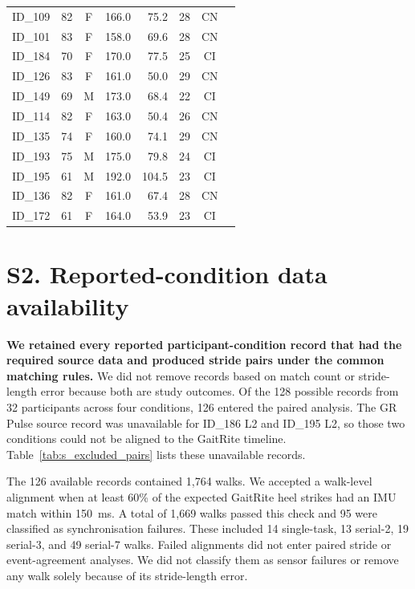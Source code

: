 \documentclass[fleqn,10pt,lineno]{wlpeerj}
\begin{document}
\begin{table}[!ht]
\begin{tabular}{@{}lccrrrcc@{}}
ID\_109 & 82 & F & 166.0 & 75.2 & 28 & CN & \\
ID\_101 & 83 & F & 158.0 & 69.6 & 28 & CN & \\
ID\_184 & 70 & F & 170.0 & 77.5 & 25 & CI & \\
ID\_126 & 83 & F & 161.0 & 50.0 & 29 & CN & \\
ID\_149 & 69 & M & 173.0 & 68.4 & 22 & CI & \\
ID\_114 & 82 & F & 163.0 & 50.4 & 26 & CN & \\
ID\_135 & 74 & F & 160.0 & 74.1 & 29 & CN & \\
ID\_193 & 75 & M & 175.0 & 79.8 & 24 & CI & \\
ID\_195 & 61 & M & 192.0 & 104.5 & 23 & CI & \\
ID\_136 & 82 & F & 161.0 & 67.4 & 28 & CN & \\
ID\_172 & 61 & F & 164.0 & 53.9 & 23 & CI & \\
\bottomrule
\end{tabular}
\end{table}


\section*{S2. Reported-condition data availability}

\textbf{We retained every reported participant-condition record that had the required source data and produced stride pairs under the common matching rules.} We did not remove records based on match count or stride-length error because both are study outcomes. Of the 128 possible records from 32 participants across four conditions, 126 entered the paired analysis. The GR Pulse source record was unavailable for ID\_186 L2 and ID\_195 L2, so those two conditions could not be aligned to the GaitRite timeline. Table~\ref{tab:s_excluded_pairs} lists these unavailable records.

The 126 available records contained 1{,}764 walks. We accepted a walk-level alignment when at least 60\% of the expected GaitRite heel strikes had an IMU match within 150~ms. A total of 1{,}669 walks passed this check and 95 were classified as synchronisation failures. These included 14 single-task, 13 serial-2, 19 serial-3, and 49 serial-7 walks. Failed alignments did not enter paired stride or event-agreement analyses. We did not classify them as sensor failures or remove any walk solely because of its stride-length error.
\end{document}
